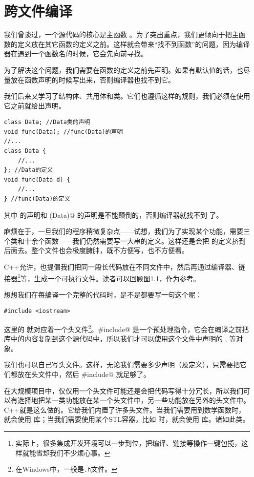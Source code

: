 \section{跨文件编译}
我们曾谈过，一个源代码的核心是主函数 \lstinline@main@。为了突出重点，我们更倾向于把主函数的定义放在其它函数的定义之前。这样就会带来``找不到函数''的问题，因为编译器在遇到一个函数名的时候，它会先向前寻找。\par
为了解决这个问题，我们需要在函数的定义之前先声明。如果有默认值的话，也尽量放在函数声明的时候写出来，否则编译器也找不到它。\par
我们后来又学习了结构体、共用体和类。它们也遵循这样的规则，我们必须在使用它之前就给出声明。
\begin{lstlisting}
class Data; //Data类的声明
void func(Data); //func(Data)的声明
//...
class Data {
    //...
}; //Data的定义
void func(Data d) {
    //...
} //func(Data)的定义
\end{lstlisting}
其中 \lstinline@Data@ 的声明和 \lstinline@func(Data)@ 的声明是不能颠倒的，否则编译器就找不到 \lstinline@Data@ 了。\par
麻烦在于，一旦我们的程序稍微复杂点——试想，我们为了实现某个功能，需要三个类和十余个函数——我们仍然需要写一大串的定义。这样还是会把 \lstinline@main@ 的定义挤到后面去。整个文件也会极度臃肿，既不方便写，也不方便看。\par
C++允许，也提倡我们把同一段长代码放在不同文件中，然后再通过编译器、链接器\footnote{实际上，很多集成开发环境可以一步到位，把编译、链接等操作一键包揽，这样就能省却我们不少烦心事。}等，生成一个可执行文件。读者可以回顾图1.1，作为参考。\par
想想我们在每编译一个完整的代码时，是不是都要写一句这个呢：
\begin{lstlisting}
#include <iostream>
\end{lstlisting}
这里的 \lstinline@iostream@ 就对应着一个头文件\footnote{在Windows中，一般是\texttt{.h}文件。}。\lstinline@#include@ 是一个预处理指令，它会在编译之前把 \lstinline@iostream@ 库中的内容复制到这个源代码中，所以我们才可以使用这个文件中声明的 \lstinline@cin@, \lstinline@cout@ 等对象。\par
我们也可以自己写头文件。这样，无论我们需要多少声明（及定义），只需要把它们都放在头文件中，然后 \lstinline@#include@ 就足够了。\par
在大规模项目中，仅仅用一个头文件可能还是会把代码写得十分冗长，所以我们可以有选择地把某一类功能放在某一个头文件中，另一些功能放在另外的头文件中。C++就是这么做的。它给我们内置了许多头文件。当我们需要用到数学函数时，就会使用 \lstinline@cmath@ 库；当我们需要使用某个STL容器，比如 \lstinline@vector@ 时，就会使用 \lstinline@vector@ 库。诸如此类。\par
